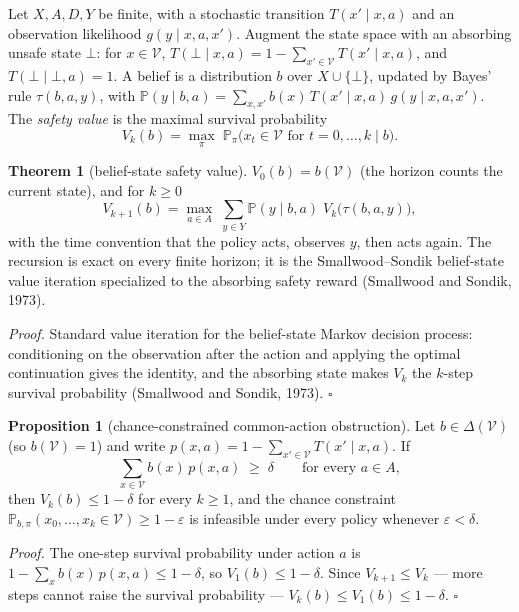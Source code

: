 \documentclass[10pt,twocolumn]{article}
\theoremstyle{definition}
\newtheorem{theorem}{Theorem}
\newtheorem{proposition}{Proposition}
\begin{document}
Let \(X, A, D, Y\) be finite, with a stochastic transition \(T(x' \mid x, a)\) and an observation likelihood \(g(y \mid x, a, x')\). Augment the state space with an absorbing unsafe state \(\bot\): for \(x \in \mathcal{V}\), \(T(\bot \mid x, a) = 1 - \sum_{x' \in \mathcal{V}} T(x' \mid x, a)\), and \(T(\bot \mid \bot, a) = 1\). A belief is a distribution \(b\) over \(X \cup \{\bot\}\), updated by Bayes' rule \(\tau(b, a, y)\), with \(\mathbb{P}(y \mid b, a) = \sum_{x, x'} b(x)\, T(x' \mid x, a)\, g(y \mid x, a, x')\). The \emph{safety value} is the maximal survival probability
\[
V_{k}(b) = \max_{\pi}\; \mathbb{P}_{\pi}\bigl( x_{t} \in \mathcal{V} \text{ for } t = 0, \dots, k \;\big|\; b \bigr).
\]

\begin{theorem}[belief-state safety value]\label{calc-thm:pomdp}
\(V_{0}(b) = b(\mathcal{V})\) (the horizon counts the current state), and for \(k \ge 0\)
\[
V_{k+1}(b) = \max_{a \in A}\; \sum_{y \in Y} \mathbb{P}(y \mid b, a)\; V_{k}\bigl(\tau(b, a, y)\bigr),
\]
with the time convention that the policy acts, observes \(y\), then acts again. The recursion is exact on every finite horizon; it is the Smallwood--Sondik belief-state value iteration specialized to the absorbing safety reward (Smallwood and Sondik, 1973).
\end{theorem}

\emph{Proof.} Standard value iteration for the belief-state Markov decision process: conditioning on the observation after the action and applying the optimal continuation gives the identity, and the absorbing state makes \(V_{k}\) the \(k\)-step survival probability (Smallwood and Sondik, 1973). \hfill\(\square\)

\begin{proposition}[chance-constrained common-action obstruction]\label{calc-prop:chance}
Let \(b \in \Delta(\mathcal{V})\) (so \(b(\mathcal{V}) = 1\)) and write \(p(x,a) = 1 - \sum_{x' \in \mathcal{V}} T(x' \mid x, a)\). If
\[
\sum_{x \in \mathcal{V}} b(x)\, p(x,a) \;\ge\; \delta \qquad \text{for every } a \in A,
\]
then \(V_{k}(b) \le 1 - \delta\) for every \(k \ge 1\), and the chance constraint \(\mathbb{P}_{b,\pi}(x_{0}, \dots, x_{k} \in \mathcal{V}) \ge 1 - \varepsilon\) is infeasible under every policy whenever \(\varepsilon < \delta\).
\end{proposition}

\emph{Proof.} The one-step survival probability under action \(a\) is \(1 - \sum_{x} b(x)\, p(x,a) \le 1 - \delta\), so \(V_{1}(b) \le 1 - \delta\). Since \(V_{k+1} \le V_{k}\) --- more steps cannot raise the survival probability --- \(V_{k}(b) \le V_{1}(b) \le 1 - \delta\). \hfill\(\square\)
\end{document}
